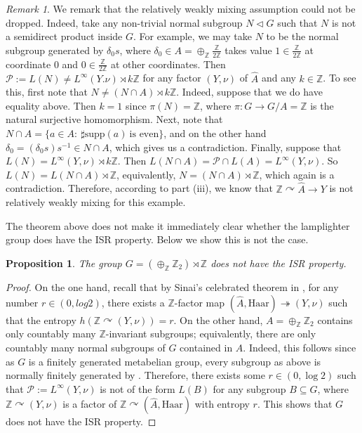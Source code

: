 \documentclass[11pt]{amsart}
\newcommand{\Z}{\mathbb Z}
\theoremstyle{plain}
\newtheorem{proposition}[theorem]{Proposition}
\theoremstyle{definition}
\theoremstyle{remark}
\newtheorem{remark}[theorem]{Remark}
\numberwithin{equation}{section}
\begin{document}
\begin{remark} \label{remark: strange normal subgroups}
We remark that the relatively weakly mixing assumption could not be dropped. Indeed, take any non-trivial normal subgroup $N\lhd G$ such that $N$ is not a semidirect product inside $G$. 
For example, we may take $N$ to be the normal subgroup generated by $\delta_0s$, where $\delta_0\in A= \oplus_{\mathbb{Z}}\frac{\mathbb{Z}}{2\mathbb{Z}}$ takes value $1\in \frac{\mathbb{Z}}{2\mathbb{Z}}$ at coordinate 0 and $0\in \frac{\mathbb{Z}}{2\mathbb{Z}}$ at other coordinates. 
Then $\mathcal{P}:=L(N)\neq L^{\infty}(Y. \nu)\rtimes k\mathbb{Z}$ for any factor $(Y, \nu)$ of $\hat{A}$ and any $k \in \Z$. To see this, first note that $N\neq (N\cap A)\rtimes k\mathbb{Z}$. Indeed, suppose that we do have equality above. Then $k=1$ since $\pi(N)=\mathbb{Z}$, where $\pi: G\rightarrow G/A=\mathbb{Z}$ is the natural surjective homomorphism. Next, note that $N\cap A=\{a\in A: ~\sharp\text{supp}(a)~\text{is even}\}$, and on the other hand $\delta_0=(\delta_0s)s^{-1}\in N\cap A$, which gives us a contradiction. Finally, suppose that $L(N)=L^{\infty}(Y,\nu)\rtimes k\mathbb{Z}$. Then $L(N\cap A)=\mathcal{P}\cap L(A)=L^{\infty}(Y,\nu)$. So $L(N)=L(N\cap A)\rtimes \mathbb{Z}$, equivalently, $N=(N\cap A)\rtimes \mathbb{Z}$, which again is a contradiction. Therefore, according to part (iii), we know that $\mathbb{Z}\curvearrowright \widehat{A}\rightarrow Y$ is not relatively weakly mixing for this example. 
\end{remark}

The theorem above does not make it immediately clear whether the lamplighter group does have the ISR property. Below we show this is not the case.

\begin{proposition}\label{proposition: lamplighter groups do not have ISR}
The group $G=(\oplus_{\mathbb{Z}}\Z_2)\rtimes \mathbb{Z}$ does not have the ISR property. 
\end{proposition}
\begin{proof}
On the one hand, recall that by Sinai's celebrated theorem in \cite{Sinai}, for any number $r\in (0,log2)$, there exists a $\mathbb{Z}$-factor map $(\widehat{A},\text{Haar})\twoheadrightarrow (Y,\nu)$ such that the entropy $h(\mathbb{Z}\curvearrowright (Y,\nu))=r$. On the other hand, $A=\oplus_{\mathbb{Z}}\Z_2$ contains only countably many $\mathbb{Z}$-invariant subgroups; equivalently, there are only countably many normal subgroups of  $G$ contained in $A$. Indeed, this follows since as $G$ is a finitely generated metabelian group, every  subgroup as above is normally finitely generated  by \cite[Lemma 6.4]{BBDZ}. Therefore, there exists some $r\in (0,\log 2)$ such that $\mathcal{P}:=L^{\infty}(Y,\nu)$ is not of the form $L(B)$ for any subgroup $B\subseteq G$, where $\mathbb{Z}\curvearrowright (Y,\nu)$ is a factor of $\mathbb{Z}\curvearrowright (\widehat{A},\text{Haar})$ with entropy $r$. This shows that $G$ does not have the ISR property. 
\end{proof}
\end{document}
